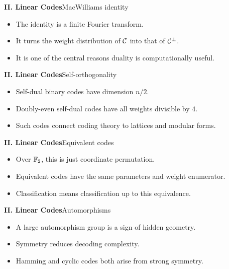 \begin{frame}{\textbf{II. Linear Codes}}{MacWilliams identity}
\small
{}
\begin{itemize}
  \item The identity is a finite Fourier transform.
  \item It turns the weight distribution of $\mathcal{C}$ into that of $\mathcal{C}^\perp$.
  \item It is one of the central reasons duality is computationally useful.
\end{itemize}
\end{frame}

\begin{frame}{\textbf{II. Linear Codes}}{Self-orthogonality}
\small
{}
\begin{itemize}
  \item Self-dual binary codes have dimension $n/2$.
  \item Doubly-even self-dual codes have all weights divisible by $4$.
  \item Such codes connect coding theory to lattices and modular forms.
\end{itemize}
\end{frame}

\begin{frame}{\textbf{II. Linear Codes}}{Equivalent codes}
\small
{}
\begin{itemize}
  \item Over $\mathbb{F}_2$, this is just coordinate permutation.
  \item Equivalent codes have the same parameters and weight enumerator.
  \item Classification means classification up to this equivalence.
\end{itemize}
\end{frame}

\begin{frame}{\textbf{II. Linear Codes}}{Automorphisms}
\small
{}
\begin{itemize}
  \item A large automorphism group is a sign of hidden geometry.
  \item Symmetry reduces decoding complexity.
  \item Hamming and cyclic codes both arise from strong symmetry.
\end{itemize}
\end{frame}

